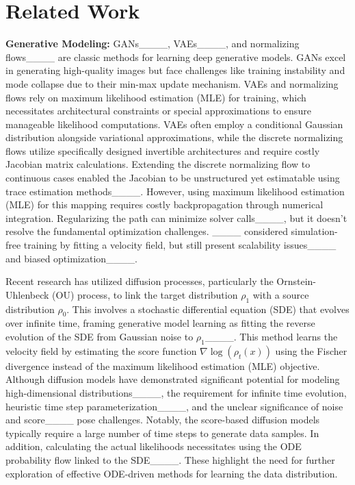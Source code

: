 \section{Related Work}
\label{sec:rel}
\textbf{Generative Modeling:} %
GANs____, VAEs____, and normalizing flows____ are classic methods for learning deep generative models. GANs excel in generating high-quality images but face challenges like training instability and mode collapse due to their min-max update mechanism. VAEs and normalizing flows rely on maximum likelihood estimation (MLE) for training, which necessitates architectural constraints or special approximations to ensure manageable likelihood computations. VAEs often employ a conditional Gaussian distribution alongside variational approximations, while the discrete normalizing flows utilize specifically designed invertible architectures and require costly Jacobian matrix calculations. Extending the discrete normalizing flow to continuous cases enabled the Jacobian to be unstructured yet estimatable using trace estimation methods____. However, using maximum likelihood estimation (MLE) for this mapping requires costly backpropagation through numerical integration. Regularizing the path can minimize solver calls____, but it doesn't resolve the fundamental optimization challenges. ____ considered simulation-free training by fitting a velocity field, but still present scalability issues____ and biased optimization____.

Recent research has utilized diffusion processes, particularly the Ornstein-Uhlenbeck (OU) process, to link the target distribution $\rho_1$ with a source distribution $\rho_0$. This involves a stochastic differential equation (SDE) that evolves over infinite time, framing  generative model learning as fitting the reverse evolution of the SDE from Gaussian noise to $\rho_1$____. This method learns the velocity field by estimating the score function $\nabla \log(\rho_t(x))$ using the Fischer divergence instead of the maximum likelihood estimation (MLE) objective. Although diffusion models have demonstrated significant potential for modeling high-dimensional distributions____, the requirement for infinite time evolution, heuristic time step parameterization____, and the unclear significance of noise and score____ pose challenges. Notably, the score-based diffusion models typically require a large number of time steps to generate data samples. In addition, calculating the actual likelihoods necessitates using the ODE probability flow linked to the SDE____. These highlight the need for further exploration of effective ODE-driven methods for learning the data distribution.  

